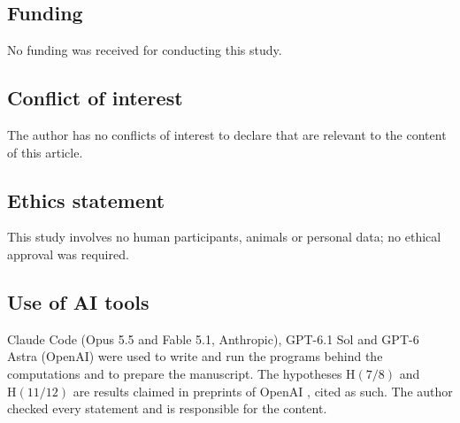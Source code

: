 \documentclass[11pt]{amsart}
\theoremstyle{definition}
\theoremstyle{remark}
\numberwithin{equation}{section}
\newcommand{\Hyp}{\mathrm{H}}
\begin{document}
\subsection*{Funding}
No funding was received for conducting this study.

\subsection*{Conflict of interest}
The author has no conflicts of interest to declare that are relevant to the content of this article.

\subsection*{Ethics statement}
This study involves no human participants, animals or personal data; no ethical approval was required.

\subsection*{Use of AI tools}
Claude Code (Opus 5.5 and Fable 5.1, Anthropic), GPT-6.1 Sol and GPT-6 Astra (OpenAI) were used to write and run the programs behind the computations and to prepare the manuscript. The hypotheses $\Hyp(7/8)$ and $\Hyp(11/12)$ are results claimed in preprints of OpenAI \cite{OAI-a,OAI-b}, cited as such. The author checked every statement and is responsible for the content.
\end{document}
